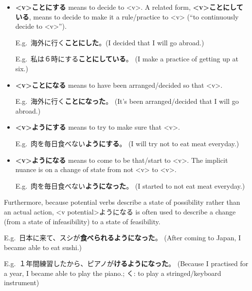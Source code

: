 \documentclass[../nihongo-gakushuu-kyouzai.tex]{subfiles}
\begin{document}

\begin{itemize}
    \item \textbf{<v>ことにする} means to decide to <v>. A related form, \textbf{<v>ことにしている}, means to decide to make it a rule/practice to <v> (``to continuously decide to <v>'').

    E.g.\ 海外に行く\textbf{ことにした}。(I decided that I will go abroad.)

    E.g.\ 私は６時にする\textbf{ことにしている}。 (I make a practice of getting up at six.)

    \item \textbf{<v>ことになる} means to have been arranged/decided so that <v>.

    E.g.\ 海外に行く\textbf{ことになった}。 (It's been arranged/decided that I will go abroad.)
    \item \textbf{<v>ようにする} means to try to make sure that <v>.

    E.g.\ 肉を毎日食べない\textbf{ようにする}。 (I will try not to eat meat everyday.)

    \item \textbf{<v>ようになる} means to come to be that/start to <v>. The implicit nuance is on a change of state from not <v> to <v>.

    E.g.\ 肉を毎日食べない\textbf{ようになった}。 (I started to not eat meat everyday.)
\end{itemize}

Furthermore, because potential verbs describe a state of possibility rather than an actual action, <v potential>ようになる is often used to describe a change (from a state of infeasibility) to a state of feasibility.

E.g.\ 日本に来て、スシが\textbf{食べられるようになった}。 (After coming to Japan, I became able to eat sushi.)

E.g.\ １年間練習したから、ピアノが\textbf{けるようになった}。 (Because I practised for a year, I became able to play the piano.; く: to play a stringed/keyboard instrument)
\end{document}
